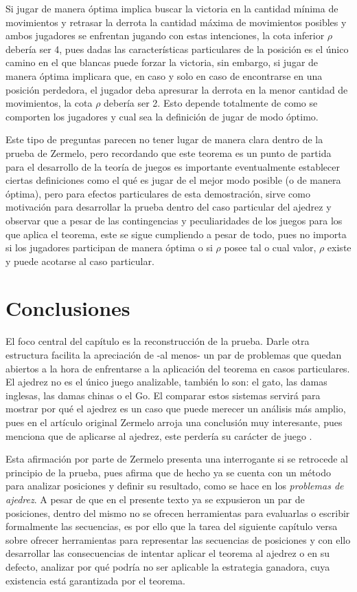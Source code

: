 \documentclass[twoside,openright,12pt,a4paper,spanish]{book}
\begin{document}
Si jugar de manera óptima implica buscar la victoria en la cantidad mínima de movimientos y retrasar la derrota la cantidad máxima de movimientos posibles y ambos jugadores se enfrentan jugando con estas intenciones, la cota inferior $\rho$ debería ser 4, pues dadas las características particulares de la posición es el único camino en el que blancas puede forzar la victoria, sin embargo, si jugar de manera óptima implicara que, en caso y solo en caso de encontrarse en una posición perdedora, el jugador deba apresurar la derrota en la menor cantidad de movimientos, la cota $\rho$ debería ser 2. Esto depende totalmente de como se comporten los jugadores y cual sea la definición de jugar de modo óptimo.

Este tipo de preguntas parecen no tener lugar de manera clara dentro de la prueba de Zermelo, pero recordando que este teorema es un punto de partida para el desarrollo de la teoría de juegos es importante eventualmente establecer ciertas definiciones como el qué es jugar de el mejor modo posible (o de manera óptima), pero para efectos particulares de esta demostración, sirve como motivación para desarrollar la prueba dentro del caso particular del ajedrez y observar que a pesar de las contingencias y peculiaridades de los juegos para los que aplica el teorema, este se sigue cumpliendo a pesar de todo, pues no importa si los jugadores participan de manera óptima o si $\rho$ posee tal o cual valor, $\rho$ existe y puede acotarse al caso particular.

\section{Conclusiones}

\noindent El foco central del capítulo es la reconstrucción de la prueba. Darle otra estructura facilita la apreciación de -al menos- un par de problemas que quedan abiertos a la hora de enfrentarse a la aplicación del teorema en casos particulares. El ajedrez no es el único juego analizable, también lo son: el gato, las damas inglesas, las damas chinas o el Go. El comparar estos sistemas servirá para mostrar por qué el ajedrez es un caso que puede merecer un análisis más amplio, pues en el artículo original Zermelo arroja una conclusión muy interesante, pues menciona que de aplicarse al ajedrez, este perdería su carácter de juego \cite{zermelo1913anwendung}.

Esta afirmación por parte de Zermelo presenta una interrogante si se retrocede al principio de la prueba, pues afirma que de hecho ya se cuenta con un método para analizar posiciones y definir su resultado, como se hace en los \emph{problemas de ajedrez}. A pesar de que en el presente texto ya se expusieron un par de posiciones, dentro del mismo no se ofrecen herramientas para evaluarlas o escribir formalmente las secuencias, es por ello que la tarea del siguiente capítulo versa sobre ofrecer herramientas para representar las secuencias de posiciones y con ello desarrollar las consecuencias de intentar aplicar el teorema al ajedrez o en su defecto, analizar por qué podría no ser aplicable la estrategia ganadora, cuya existencia está garantizada por el teorema.
\end{document}
